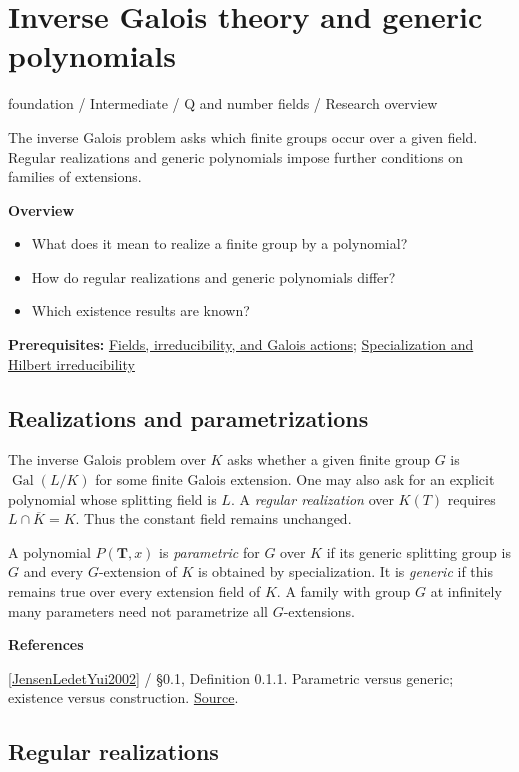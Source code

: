 \documentclass[11pt,a4paper,oneside,openany]{book}
\newenvironment{sources}{\par\smallskip\begingroup\footnotesize\color{atlasgray}\leftskip=10pt\setlength{\parskip}{2pt}}{\par\endgroup\smallskip}
\begin{document}
\chapter{Inverse Galois theory and generic polynomials}\label{article:inverse-galois}\hypertarget{article:inverse-galois}{}\color{black}
{\sffamily\small\color{atlasgold}foundation / Intermediate / Q and number fields / Research overview}\par\medskip
The inverse Galois problem asks which finite groups occur over a given field. Regular realizations and generic polynomials impose further conditions on families of extensions.\par\medskip
\textbf{Overview}\begin{itemize}
\item What does it mean to realize a finite group by a polynomial?
\item How do regular realizations and generic polynomials differ?
\item Which existence results are known?
\end{itemize}
{\small\textbf{Prerequisites:} \hyperlink{article:foundations}{Fields, irreducibility, and Galois actions}; \hyperlink{article:specialization}{Specialization and Hilbert irreducibility}}\par
{}\section{Realizations and parametrizations}
\color{black} The inverse Galois problem over \(K\) asks whether a given finite group \(G\) is \(\operatorname{Gal}(L/K)\) for some finite Galois extension. One may also ask for an explicit polynomial whose splitting field is \(L\). A \emph{regular realization} over \(K(T)\) requires \(L\cap\overline K=K\). Thus the constant field remains unchanged.\par
\color{black} A polynomial \(P(\mathbf T,x)\) is \emph{parametric} for \(G\) over \(K\) if its generic splitting group is \(G\) and every \(G\)-extension of \(K\) is obtained by specialization. It is \emph{generic} if this remains true over every extension field of \(K\). A family with group \(G\) at infinitely many parameters need not parametrize all \(G\)-extensions.\par
\begin{sources}
\textbf{References}\par\smallskip
\noindent\hyperlink{ref:JensenLedetYui2002}{[JensenLedetYui2002]} / §0.1, Definition 0.1.1. Parametric versus generic; existence versus construction. \href{https://library.slmath.org/books/Book45/index.html}{Source}.\par
\end{sources}\color{black}
\section{Regular realizations}
\end{document}
